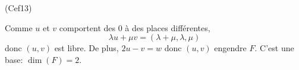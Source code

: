 \begin{tiny}(Cef13)\end{tiny} Comme $u$ et $v$ comportent des $0$ à des places différentes, 
\[
 \lambda u + \mu v = (\lambda + \mu, \lambda, \mu)
\]
donc $(u,v)$ est libre. De plus, $2u-v = w$ donc $(u,v)$ engendre $F$. C'est une base: $\dim(F) = 2$.
